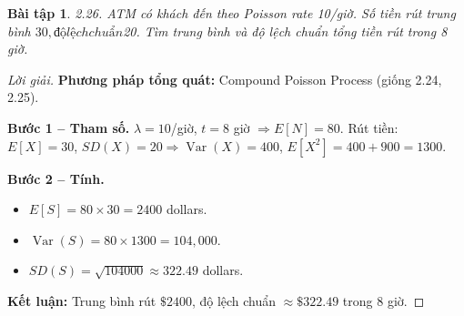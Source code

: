 \documentclass[8pt,a4paper]{article}
\newtheorem{exercise}{Bài tập}
\newenvironment{solution}{\begin{proof}[Lời giải]}{\end{proof}}
\newcommand{\Var}{\operatorname{Var}}
\begin{document}
\begin{exercise}
2.26. ATM có khách đến theo Poisson rate 10/giờ. Số tiền rút trung bình $30, độ lệch chuẩn $20. Tìm trung bình và độ lệch chuẩn tổng tiền rút trong 8 giờ.
\end{exercise}
\begin{solution}
\textbf{Phương pháp tổng quát:} Compound Poisson Process (giống 2.24, 2.25).

\textbf{Bước 1 -- Tham số.} $\lambda = 10$/giờ, $t = 8$ giờ $\Rightarrow E[N] = 80$. Rút tiền: $E[X] = 30$, $SD(X) = 20 \Rightarrow \Var(X) = 400$, $E[X^2] = 400 + 900 = 1300$.

\textbf{Bước 2 -- Tính.}
\begin{itemize}[nosep]
  \item $E[S] = 80 \times 30 = \boxed{2400}$ dollars.
  \item $\Var(S) = 80 \times 1300 = 104{,}000$.
  \item $SD(S) = \sqrt{104000} \approx \boxed{322.49}$ dollars.
\end{itemize}

\textbf{Kết luận:} Trung bình rút $\$2400$, độ lệch chuẩn $\approx \$322.49$ trong 8 giờ.
\end{solution}
\end{document}
